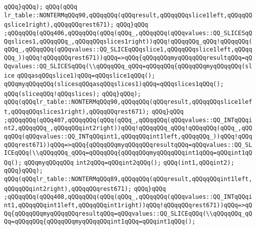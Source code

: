 \verb|qQQq}qQQq);|\newline
\verb|qQQq(qQQq|\newline
\verb|lr_table::NONTERMqQQq90,qQQqqQQq(qQQqresult,qQQqqQQqslice1left,qQQqqQQqslice1right),qQQqqQQqrest671);|\newline
\verb|qQQq}qQQq|\newline
\verb|;qQQqqQQq(qQQq406,qQQqqQQq(qQQq(qQQq_,qQQqqQQq(qQQqvalues::QQ_SLICESqQQqslices1,qQQqqQQq_,qQQqqQQqslices1right))qQQq!qQQqqQQq_qQQq!qQQqqQQq(qQQq_,qQQqqQQq(qQQqvalues::QQ_SLICEqQQqslice1,qQQqqQQqslice1left,qQQqqQQq_))qQQq!qQQqqQQqrest671))qQQq=>qQQq{qQQqqQQqmyqQQqqQQqresultqQQq=qQQqvalues::QQ_SLICESqQQq(\\qQQqqQQq_qQQq=qQQqqQQq{qQQqqQQqmyqQQqqQQq(slice|\newline
\verb|qQQqasqQQqslice1)qQQq=qQQqslice1qQQq();|\newline
\verb|qQQqmyqQQqqQQq(slicesqQQqasqQQqslices1)qQQq=qQQqslices1qQQq();|\newline
\verb|qQQq(sliceqQQq!qQQqslices);|\newline
\verb|qQQq}qQQq);|\newline
\verb|qQQq(qQQqlr_table::NONTERMqQQq90,qQQqqQQq(qQQqresult,qQQqqQQqslice1left,qQQqqQQqslices1right),qQQqqQQqrest671);|\newline
\verb|qQQq}qQQq|\newline
\verb|;qQQqqQQq(qQQq407,qQQqqQQq(qQQq(qQQq_,qQQqqQQq(qQQqvalues::QQ_INTqQQqint2,qQQqqQQq_,qQQqqQQqint2right))qQQq!qQQqqQQq_qQQq!qQQqqQQq(qQQq_,qQQqqQQq(qQQqvalues::QQ_INTqQQqint1,qQQqqQQqint1left,qQQqqQQq_))qQQq!qQQqqQQqrest671))qQQq=>qQQq{qQQqqQQqmyqQQqqQQqresultqQQq=qQQqvalues::QQ_SLICEqQQq(\\qQQqqQQq_qQQq=qQQqqQQq{qQQqqQQqmyqQQqqQQqint1qQQq=qQQqint1qQQq();|\newline
\verb|qQQqmyqQQqqQQq|\newline
\verb|int2qQQq=qQQqint2qQQq();|\newline
\verb|qQQq(int1,qQQqint2);|\newline
\verb|qQQq}qQQq);|\newline
\verb|qQQq(qQQqlr_table::NONTERMqQQq89,qQQqqQQq(qQQqresult,qQQqqQQqint1left,qQQqqQQqint2right),qQQqqQQqrest671);|\newline
\verb|qQQq}qQQq|\newline
\verb|;qQQqqQQq(qQQq408,qQQqqQQq(qQQq(qQQq_,qQQqqQQq(qQQqvalues::QQ_INTqQQqint1,qQQqqQQqint1left,qQQqqQQqint1right))qQQq!qQQqqQQqrest671))qQQq=>qQQq{qQQqqQQqmyqQQqqQQqresultqQQq=qQQqvalues::QQ_SLICEqQQq(\\qQQqqQQq_qQQq=qQQqqQQq{qQQqqQQqmyqQQqqQQqint1qQQq=qQQqint1qQQq();|\newline
